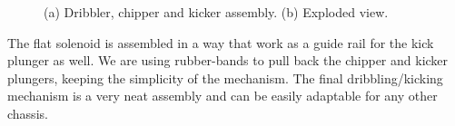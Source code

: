 \begin{figure}[!htb]
	\centering
	\caption{(a) Dribbler, chipper and kicker assembly. (b) Exploded view.}
	\label{mec4}
\end{figure}

The flat solenoid is assembled in a way that work as a guide rail for the kick plunger as well. We are using rubber-bands to pull back the chipper and kicker plungers, keeping the simplicity of the mechanism. The final dribbling/kicking mechanism is a very neat assembly and can be easily adaptable for any other chassis.
